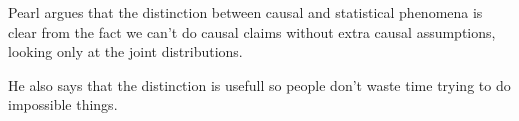 Pearl argues that the distinction between causal and statistical phenomena is clear from the fact we can't do causal claims without extra causal assumptions, looking only at the joint distributions.

He also says that the distinction is usefull so people don't waste time trying to do impossible things.


